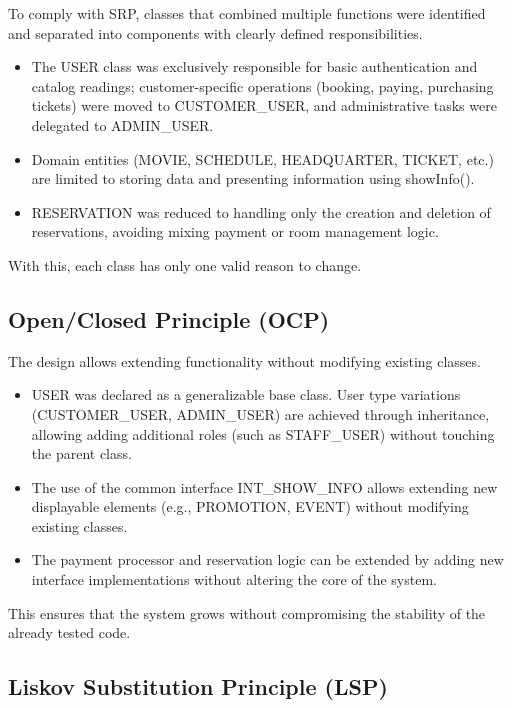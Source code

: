 \documentclass[12pt, letterpaper]{article}
\begin{document}
To comply with SRP, classes that combined multiple functions were identified and separated into components with clearly defined responsibilities.

\begin{itemize}
    \item The USER class was exclusively responsible for basic authentication and catalog readings; customer-specific operations (booking, paying, purchasing tickets) were moved to CUSTOMER\_USER, and administrative tasks were delegated to ADMIN\_USER.
    \item Domain entities (MOVIE, SCHEDULE, HEADQUARTER, TICKET, etc.) are limited to storing data and presenting information using showInfo().
    \item RESERVATION was reduced to handling only the creation and deletion of reservations, avoiding mixing payment or room management logic.
\end{itemize}

With this, each class has only one valid reason to change.

\subsection{Open/Closed Principle (OCP)}

The design allows extending functionality without modifying existing classes.

\begin{itemize}
    \item USER was declared as a generalizable base class. User type variations (CUSTOMER\_USER, ADMIN\_USER) are achieved through inheritance, allowing adding additional roles (such as STAFF\_USER) without touching the parent class.
    \item The use of the common interface INT\_SHOW\_INFO allows extending new displayable elements (e.g., PROMOTION, EVENT) without modifying existing classes.
    \item The payment processor and reservation logic can be extended by adding new interface implementations without altering the core of the system.
\end{itemize}

This ensures that the system grows without compromising the stability of the already tested code.

\subsection{Liskov Substitution Principle (LSP)}
\end{document}

